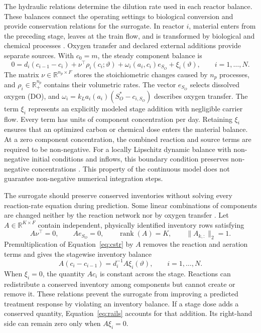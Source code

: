 \documentclass[a4paper,fleqn]{cas-sc}
\newcommand{\R}{\mathbb{R}}
\begin{document}
The hydraulic relations determine the dilution rate used in each reactor balance. These balances connect the operating settings to biological conversion and provide conservation relations for the surrogate. In reactor $i$, material enters from the preceding stage, leaves at the train flow, and is transformed by biological and chemical processes \citep{Henze2006}. Oxygen transfer and declared external additions provide separate sources. With $c_0=m$, the steady component balance is
\begin{equation}
0=d_i(c_{i-1}-c_i)+\nu^\top\rho_i(c_i;\vartheta)
+\omega_i(a_i,c_i)e_{S_O}+\xi_i(\vartheta),
\qquad i=1,\ldots,N.
\label{eq:cstr}
\end{equation}
The matrix $\nu\in\R^{n_p\times F}$ stores the stoichiometric changes caused by $n_p$ processes, and $\rho_i\in\R_+^{n_p}$ contains their volumetric rates. The vector $e_{S_O}$ selects dissolved oxygen (DO), and $\omega_i=k_La_i(a_i)(S_O^*-c_{i,S_O})$ describes oxygen transfer. The term $\xi_i$ represents an explicitly modeled stage addition with negligible carrier flow. Every term has units of component concentration per day. Retaining $\xi_i$ ensures that an optimized carbon or chemical dose enters the material balance. At a zero component concentration, the combined reaction and source terms are required to be non-negative. For a locally Lipschitz dynamic balance with non-negative initial conditions and inflows, this boundary condition preserves non-negative concentrations \citep{Haddad2010}. This property of the continuous model does not guarantee non-negative numerical integration steps.

The surrogate should preserve conserved inventories without solving every reaction-rate equation during prediction. Some linear combinations of components are changed neither by the reaction network nor by oxygen transfer \citep{SturmWexler2022,KircherVotsmeier2025}. Let $A\in\R^{K\times F}$ contain independent, physically identified inventory rows satisfying
\begin{equation}
A\nu^\top=0,\qquad Ae_{S_O}=0,\qquad
\operatorname{rank}(A)=K,\qquad \|A_{k,:}\|_2=1.
\label{eq:invariants}
\end{equation}
Premultiplication of Equation~\eqref{eq:cstr} by $A$ removes the reaction and aeration terms and gives the stagewise inventory balance
\begin{equation}
A(c_i-c_{i-1})=d_i^{-1}A\xi_i(\vartheta),\qquad i=1,\ldots,N.
\label{eq:rails}
\end{equation}
When $\xi_i=0$, the quantity $Ac_i$ is constant across the stage. Reactions can redistribute a conserved inventory among components but cannot create or remove it. These relations prevent the surrogate from improving a predicted treatment response by violating an inventory balance. If a stage dose adds a conserved quantity, Equation~\eqref{eq:rails} accounts for that addition. Its right-hand side can remain zero only when $A\xi_i=0$.
\end{document}
